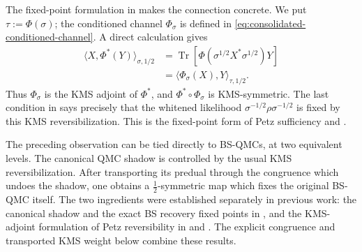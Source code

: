 \documentclass[11pt]{article}
\theoremstyle{remark}
\newcommand{\1}{\mathbbm{1}}
\begin{document}
The fixed-point formulation in
 makes the
connection concrete.  We put $\tau:=\Phi(\sigma)$; the conditioned
channel $\Phi_\sigma$ is defined in
\eqref{eq:consolidated-conditioned-channel}.  A direct calculation
gives
\begin{equation}
 \begin{aligned}
 \langle X,\Phi^*(Y)\rangle_{\sigma,1/2}
 &=\operatorname{Tr}\!\left[
   \Phi(\sigma^{1/2}X^*\sigma^{1/2})Y\right]\\
 &=\langle\Phi_\sigma(X),Y\rangle_{\tau,1/2}.
 \end{aligned}
 \label{eq:consolidated-conditioned-KMS-adjoint}
\end{equation}
Thus $\Phi_\sigma$ is the KMS adjoint of $\Phi^*$, and
$\Phi^*\circ\Phi_\sigma$ is KMS-symmetric.  The last condition in
 says precisely
that the whitened likelihood
$\sigma^{-1/2}\rho\sigma^{-1/2}$ is fixed by this KMS
reversibilization.  This is the fixed-point form of Petz sufficiency
\cite{Petz-SufficiencyChannels-1978} and
\cite[Theorem~3.18(ix)]{hiai2017different}.

The preceding observation can be tied directly to BS-QMCs, at two
equivalent levels.  The canonical QMC shadow is controlled by the
usual KMS reversibilization.  After transporting its predual through
the congruence which undoes the shadow, one obtains a
$\frac12$-symmetric map which fixes the original BS-QMC itself.
The two ingredients were established separately in previous work:
the canonical shadow and the exact BS recovery fixed points in
\cite[Theorem~3.3 and Corollary~3.9]{Bluhm:2025kai}, and the
KMS-adjoint formulation of Petz reversibility in
\cite{Petz-SufficiencyChannels-1978,petz1986quasi} and
\cite[Section~2.2]{carlen2017gradient}.  The explicit congruence and
transported KMS weight below combine these results.
\end{document}
